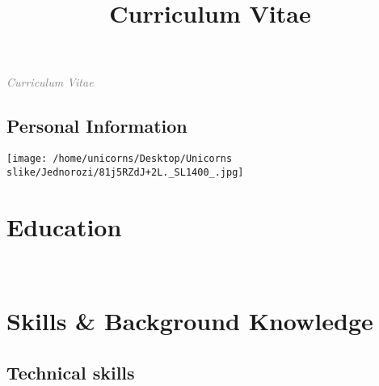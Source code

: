 \documentclass[11pt,a4paper,sans]{moderncv} %
\title{Curriculum Vitae}
\begin{document}
\textit{\Huge{\textcolor{gray}{Curriculum Vitae}}}

\hrulefill

\begin{multicols}{2}
  \section{Personal Information}
  \columnbreak
  \texttt{[image: /home/unicorns/Desktop/Unicorns slike/Jednorozi/81j5RZdJ+2L.\_SL1400\_.jpg]}
\end{multicols}


\section{Education}
                 




\

\section{Skills \& Background Knowledge}

\subsection{Technical skills}
                 
\end{document}
